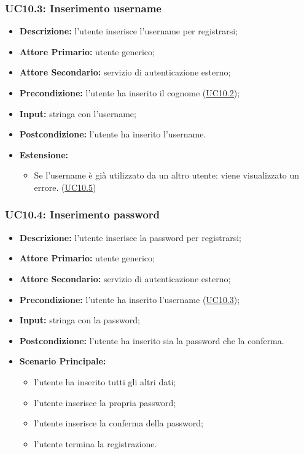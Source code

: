 \subsubsection{UC10.3: Inserimento username}
\label{sec:UC10.3}
\begin{itemize}
    \item \textbf{Descrizione:} l'utente inserisce l'username per registrarsi;
    \item \textbf{Attore Primario:} utente generico;
    \item \textbf{Attore Secondario:} servizio di autenticazione esterno;
    \item \textbf{Precondizione:} l'utente ha inserito il cognome (\hyperref[sec:UC10.2]{\underline{UC10.2}});
    \item \textbf{Input:} stringa con l'username;
    \item \textbf{Postcondizione:} l'utente ha inserito l'username.
    \item \textbf{Estensione:} 
    \begin{itemize}
        \item Se l'username è già utilizzato da un altro utente: viene visualizzato un errore. (\hyperref[sec:UC10.5]{\underline{UC10.5}}) 
    \end{itemize} 
\end{itemize}

\subsubsection{UC10.4: Inserimento password}
\label{sec:UC10.4}
\begin{itemize}
    \item \textbf{Descrizione:} l'utente inserisce la password per registrarsi;
    \item \textbf{Attore Primario:} utente generico;
    \item \textbf{Attore Secondario:} servizio di autenticazione esterno;
    \item \textbf{Precondizione:} l'utente ha inserito l'username (\hyperref[sec:UC10.3]{\underline{UC10.3}});
    \item \textbf{Input:} stringa con la password;
    \item \textbf{Postcondizione:} l'utente ha inserito sia la password che la conferma.
    \item \textbf{Scenario Principale:}
        \begin{itemize}
            \item l'utente ha inserito tutti gli altri dati;
            \item l'utente inserisce la propria password;
            \item l'utente inserisce la conferma della password;
            \item l'utente termina la registrazione.
        \end{itemize} 
\end{itemize}

